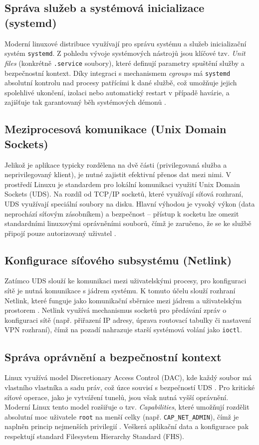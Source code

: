 \subsection{Správa služeb a systémová inicializace (systemd)}
Moderní linuxové distribuce využívají pro správu systému a služeb inicializační systém \texttt{systemd}. Z pohledu vývoje systémových nástrojů jsou klíčové tzv. \textit{Unit files} (konkrétně \texttt{.service} soubory), které definují parametry spuštění služby a bezpečnostní kontext. Díky integraci s mechanismem \textit{cgroups} má \texttt{systemd} absolutní kontrolu nad procesy patřícími k dané službě, což umožňuje jejich spolehlivé ukončení, izolaci nebo automatický restart v případě havárie, a zajišťuje tak garantovaný běh systémových démonů \cite{ward_linux}.

\subsection{Meziprocesová komunikace (Unix Domain Sockets)}
\label{sec:uds_theory}
Jelikož je aplikace typicky rozdělena na dvě části (privilegovaná služba a neprivilegovaný klient), je nutné zajistit efektivní přenos dat mezi nimi. V prostředí Linuxu je standardem pro lokální komunikaci využití Unix Domain Sockets (UDS). Na rozdíl od TCP/IP socketů, které využívají síťová rozhraní, UDS využívají speciální soubory na disku. Hlavní výhodou je vysoký výkon (data neprochází síťovým zásobníkem) a bezpečnost – přístup k socketu lze omezit standardními linuxovými oprávněními souborů, čímž je zaručeno, že se ke službě připojí pouze autorizovaný uživatel \cite{ward_linux}.

\subsection{Konfigurace síťového subsystému (Netlink)}
Zatímco UDS slouží ke komunikaci mezi uživatelskými procesy, pro konfiguraci sítě je nutná komunikace s jádrem systému. K tomuto účelu slouží rozhraní Netlink, které funguje jako komunikační sběrnice mezi jádrem a uživatelským prostorem \cite{ward_linux}. Netlink využívá mechanismus socketů pro předávání zpráv o konfiguraci sítě (např. přiřazení IP adresy, úprava routovací tabulky či nastavení VPN rozhraní), čímž na pozadí nahrazuje starší systémová volání jako \texttt{ioctl}.

\subsection{Správa oprávnění a bezpečnostní kontext}
Linux využívá model Discretionary Access Control (DAC), kde každý soubor má vlastního vlastníka a sadu práv, což úzce souvisí s bezpečností UDS \cite{ward_linux}. Pro kritické síťové operace, jako je vytváření tunelů, jsou však nutná vyšší oprávnění. Moderní Linux tento model rozšiřuje o tzv. \textit{Capabilities}, které umožňují rozdělit absolutní moc uživatele \texttt{root} na menší celky (např. \texttt{CAP\_NET\_ADMIN}), čímž je naplněn princip nejmenších privilegií \cite{ward_linux}. Veškerá aplikační data a konfigurace pak respektují standard Filesystem Hierarchy Standard (FHS).
